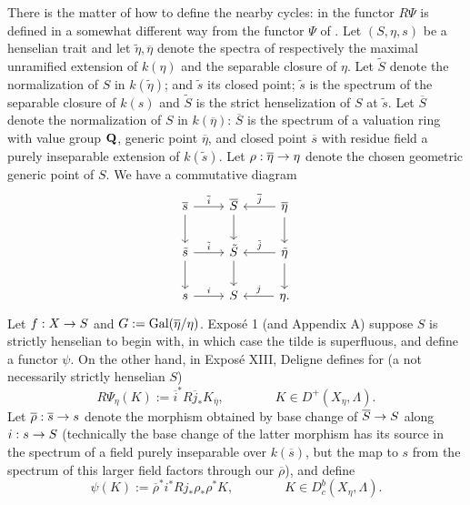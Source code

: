 \documentclass[deligne.tex]{subfiles}
\begin{document}
There is the matter of how to define the nearby cycles:
in \cite[XIII 2.1]{SGA7} the functor $R\Psi$ is defined in a somewhat 
different way from the functor $\Psi$ of \cite[I 2.2]{SGA7}.
Let $(S,\eta,s)$ be a henselian trait and let
$\tilde\eta,\overline\eta$ denote the spectra of
respectively the maximal unramified extension of $k(\eta)$ and the
separable closure of $\eta$.
Let $\tilde S$ denote the normalization of $S$ in $k(\tilde\eta)$; and
$\tilde s$ its closed point; $\tilde s$ is the spectrum of the separable
closure of $k(s)$ and $\tilde S$ is the strict henselization of $S$ at
$\tilde s$.
Let $\overline S$ denote the normalization of $S$ in $k(\overline\eta)$:
$\overline S$ is the spectrum of a valuation ring with value group $\mathbf{Q}$,
generic point $\overline\eta$, and closed point $\overline s$ with residue 
field a purely inseparable extension of $k(\tilde s)$.
Let $\rho:\overline\eta\rightarrow\eta$ denote the chosen geometric generic point
of $S$. We have a commutative diagram
\begin{equation*}\begin{tikzcd}
	\overline s\arrow[d]\arrow[r,"\overline i"]&
	\overline S\arrow[d]&\overline\eta\arrow[l,"\overline j"']\arrow[d] \\
	\tilde s\arrow[d]\arrow[r,"\tilde i"]&
	\tilde S\arrow[d]&\tilde\eta\arrow[l,"\tilde j"']\arrow[d] \\
	s\arrow[r,"i"]& S&\eta\arrow[l,"j"'].
\end{tikzcd}\end{equation*}
Let $f:X\rightarrow S$ and $G:=\operatorname{Gal}(\overline\eta/\eta)$.
Exposé 1 (and Appendix A) suppose $S$ is strictly henselian to begin with, 
in which case the tilde is superfluous, and define a functor $\psi$.
On the other hand, in Exposé XIII, Deligne defines for (a not necessarily
strictly henselian $S$)
\begin{equation*}
	R\Psi_\eta(K):=\overline i^*R\overline j_*K_{\overline\eta},
	\qquad\qquad K\in D^+(X_\eta,\Lambda).
\end{equation*}
Let $\overline\rho:\overline s\rightarrow s$ denote the morphism obtained by base
change of $\overline S\rightarrow S$ along $i:s\rightarrow S$
(technically the base change of the latter morphism has its source in the
spectrum of a field purely inseparable over $k(\overline s)$, but the map
to $s$ from the spectrum of this larger field factors through our
$\overline\rho$), and define
\begin{equation*}
	\psi(K):=\overline\rho^*i^*Rj_*\rho_*\rho^*K,
	\qquad\qquad K\in D_c^b(X_\eta,\Lambda).
\end{equation*}
\end{document}
